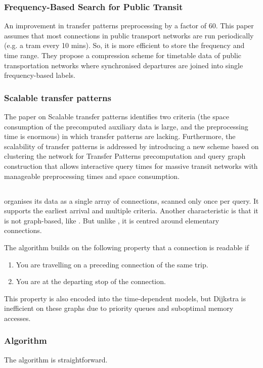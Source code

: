 \subsubsection{Frequency-Based Search for Public Transit}
An improvement in transfer patterns preprocessing by a factor of 60. This paper\cite{bast_frequency-based_2014} assumes that most connections in public transport networks are run periodically (e.g. a tram every 10 mins). So, it is more efficient to store the frequency and time range. They propose a compression scheme for timetable data of public transportation networks where synchronised departures are joined into single frequency-based labels.
\subsubsection{Scalable transfer patterns}
The paper on Scalable transfer patterns \cite{bast_scalable_2015} identifies two criteria (the space consumption of the precomputed auxiliary data is large, and the preprocessing time is enormous) in which transfer patterns are lacking. Furthermore, the scalability of transfer patterns is addressed by introducing a new scheme based on clustering the network for Transfer Patterns precomputation and query graph construction that allows interactive query times for massive transit networks with manageable preprocessing times and space consumption. 
\subsection{}
 \cite{dibbelt_intriguingly_2013} organises its data as a single array of connections, scanned only once per query. It supports the earliest arrival and multiple criteria. Another characteristic is that it is not graph-based, like . But unlike , it is centred around elementary connections.

The algorithm builds on the following property that a connection is readable if \begin{enumerate}
    \item You are travelling on a preceding connection of the same trip. 
    \item You are at the departing stop of the connection.
\end{enumerate}
This property is also encoded into the time-dependent models\cite{pyrga_efficient_2008}, but Dijkstra is inefficient on these graphs due to priority queues and suboptimal memory accesses. 
\subsubsection{Algorithm}
The  algorithm is straightforward. 

